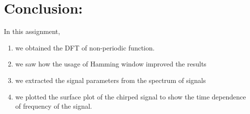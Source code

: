 \documentclass[11pt, a4paper]{article}
\begin{document}
\section{Conclusion:}
In this assignment,
\begin{enumerate}
    \item we obtained the DFT of non-periodic function.
    \item we saw how the usage of Hamming window improved the results
    \item we extracted the signal parameters from the spectrum of signals
    \item we plotted the surface plot of the chirped signal to show the time dependence of frequency of the signal.
\end{enumerate}
\end{document}
